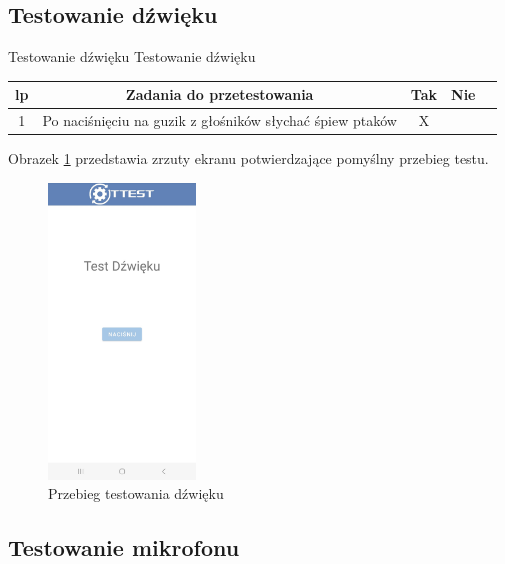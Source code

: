 \newpage


\subsection{Testowanie dźwięku}

\begin{tabela}
	{Testowanie dźwięku}	%
	{Testowanie dźwięku}	%
	{
		\begin{tabular}{|c|c|c|c|c|} \hline
			\textbf{lp} & \textbf{Zadania do przetestowania} & \textbf{Tak} & \textbf{Nie} \\ \hline
			1 & Po naciśnięciu na guzik z głośników słychać śpiew ptaków & X & ~ \\ \hline
	\end{tabular}	}
	\label{tab:tablica_dzwiek}
\end{tabela}

Obrazek \ref{rys:dzwiek} przedstawia zrzuty ekranu potwierdzające pomyślny przebieg testu.

\begin{figure}[!hbt]
	\begin{center}
		\includegraphics[angle=360, width=0.35\textwidth]{rys/punkt5/dzwiek.jpg}
		\caption{Przebieg testowania dźwięku}
		\label{rys:dzwiek}
	\end{center}
\end{figure} 

\newpage


\subsection{Testowanie mikrofonu}

